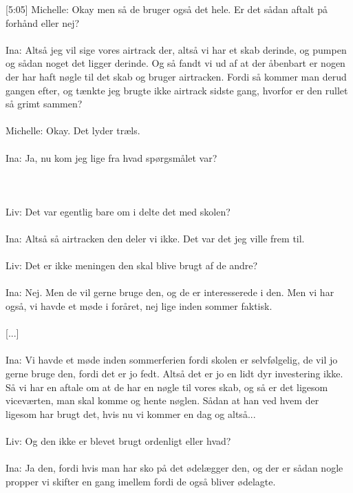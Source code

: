 [5:05]
Michelle: Okay men så de bruger også det hele. Er det sådan aftalt på forhånd eller nej?
\\\\
Ina: Altså jeg vil sige vores airtrack der, altså vi har et skab derinde, og pumpen og sådan noget det ligger derinde. Og så fandt vi ud af at der åbenbart er nogen der har haft nøgle til det skab og bruger airtracken. Fordi så kommer man derud gangen efter, og tænkte jeg brugte ikke airtrack sidste gang, hvorfor er den rullet så grimt sammen?
\\\\
Michelle: Okay. Det lyder træls.
\\\\
Ina: Ja, nu kom jeg lige fra hvad spørgsmålet var?
\\\\
[...]
\\\\
Liv: Det var egentlig bare om i delte det med skolen?
\\\\
[5:42]
Ina: Altså så airtracken den deler vi ikke. Det var det jeg ville frem til. 
\\\\
Liv: Det er ikke meningen den skal blive brugt af de andre?
\\\\
Ina: Nej. Men de vil gerne bruge den, og de er interesserede i den. Men vi har også, vi havde et møde i foråret, nej lige inden sommer faktisk. 
\\\\
[...]
\\\\
Ina: Vi havde et møde inden sommerferien fordi skolen er selvfølgelig, de vil jo gerne bruge den, fordi det er jo fedt. Altså det er jo en lidt dyr investering ikke. Så vi har en aftale om at de har en nøgle til vores skab, og så er det ligesom viceværten, man skal komme og hente nøglen. Sådan at han ved hvem der ligesom har brugt det, hvis nu vi kommer en dag og altså...
\\\\
Liv: Og den ikke er blevet brugt ordenligt eller hvad?
\\\\
Ina: Ja den, fordi hvis man har sko på det ødelægger den, og der er sådan nogle propper vi skifter en gang imellem fordi de også bliver ødelagte. 
\\\\
